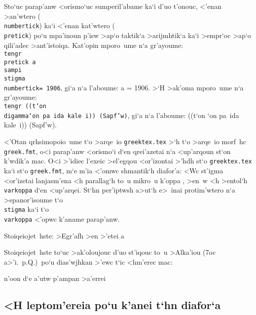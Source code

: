 Sto`uc parap'anw <orismo`uc sumperil'abame ka`i d'uo t'onouc, <'enan
>an'wtero ({\tt\\numbertick}) ka`i <'enan kat'wtero ({\tt\\pretick})
po`u mpa'inoun p'isw >ap`o taktik`a >arijmhtik`a ka`i >empr`oc >ap`o
qili'adec >ant'istoiqa.  Kat'opin mporo~ume n`a gr'ayoume:
{\tt\lb\\tengr \\pretick a\\sampi\\stigma \\numbertick\rb = 1906}, gi`a
n`a l'aboume: {\tengr\pretick a\sampi\stigma\numbertick} = 1906.  >`H
>ak'oma mporo~ume n`a gr'ayoume: {\tt\lb\\tengr ((t`on
\\digamma\lb\rb`on pa~ida kale~i)) (Sapf'w)\rb}, gi`a n`a l'aboume:
((t`on \digamma{}`on pa~ida kale~i)) (Sapf'w).

<'Otan qrhsimopoio~ume t`o >arqe~io {\tt greektex.tex} >`h t`o >arqe~io
morf~hc {\tt greek.fmt}, o<i parap'anw <orismo`i d`en qrei'azetai n`a
<up'arqoun st`on k'wdik'a mac.  O<i >'idiec l'exeic >el'egqou
<or'izontai >'hdh st`o {\tt greektex.tex} ka`i st`o {\tt greek.fmt}, m`e
m'ia <'omwc shmantik`h diafor'a:  <Wc st'igma <or'izetai lanjasm'ena <h
parallag`h to~u mikro~u k'oppa \varkoppa, >en~w <h >entol`h
{\tt\\varkoppa} d`en <up'arqei.  St`hn per'iptwsh a>ut`h e>~inai
protim'wtero n`a >epanor'isoume t`o {\tt\\stigma} ka`i t`o
{\tt\\varkoppa} <'opwc k'aname parap'anw.

\exercise Stoiqeiojet~hste: >Egr'afh >en >'etei
\pretick{}a\sampi\varkoppa\stigma\numbertick

\exercise Stoiqeiojet~hste to`uc >ak'oloujouc d'uo st'iqouc to~u >Alka'iou
(7oc a>'i.\ p.Q.)\ po`u dias'wjhkan >'ewc t`ic <hm'erec mac:

{\leftskip=2in\obeylines
\qquad n'oon d`e \digamma a'utw
\parskip=0pt p'ampan >a'errei

}

\subsection{<H leptom'ereia po`u k'anei t`hn diafor`a}

